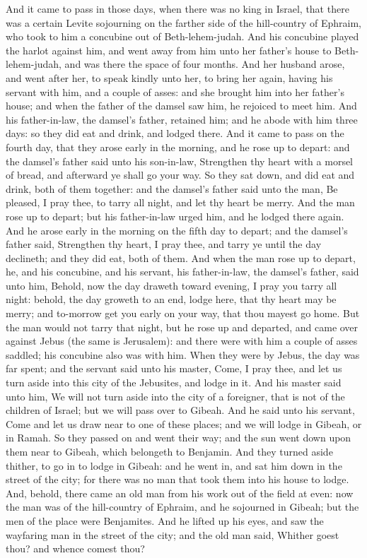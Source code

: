 And it came to pass in those days, when there was no king in Israel, that there was a certain Levite sojourning on the farther side of the hill-country of Ephraim, who took to him a concubine out of Beth-lehem-judah. And his concubine played the harlot against him, and went away from him unto her father’s house to Beth-lehem-judah, and was there the space of four months. And her husband arose, and went after her, to speak kindly unto her, to bring her again, having his servant with him, and a couple of asses: and she brought him into her father’s house; and when the father of the damsel saw him, he rejoiced to meet him. And his father-in-law, the damsel’s father, retained him; and he abode with him three days: so they did eat and drink, and lodged there. And it came to pass on the fourth day, that they arose early in the morning, and he rose up to depart: and the damsel’s father said unto his son-in-law, Strengthen thy heart with a morsel of bread, and afterward ye shall go your way. So they sat down, and did eat and drink, both of them together: and the damsel’s father said unto the man, Be pleased, I pray thee, to tarry all night, and let thy heart be merry. And the man rose up to depart; but his father-in-law urged him, and he lodged there again. And he arose early in the morning on the fifth day to depart; and the damsel’s father said, Strengthen thy heart, I pray thee, and tarry ye until the day declineth; and they did eat, both of them. And when the man rose up to depart, he, and his concubine, and his servant, his father-in-law, the damsel’s father, said unto him, Behold, now the day draweth toward evening, I pray you tarry all night: behold, the day groweth to an end, lodge here, that thy heart may be merry; and to-morrow get you early on your way, that thou mayest go home.  But the man would not tarry that night, but he rose up and departed, and came over against Jebus (the same is Jerusalem): and there were with him a couple of asses saddled; his concubine also was with him. When they were by Jebus, the day was far spent; and the servant said unto his master, Come, I pray thee, and let us turn aside into this city of the Jebusites, and lodge in it. And his master said unto him, We will not turn aside into the city of a foreigner, that is not of the children of Israel; but we will pass over to Gibeah. And he said unto his servant, Come and let us draw near to one of these places; and we will lodge in Gibeah, or in Ramah. So they passed on and went their way; and the sun went down upon them near to Gibeah, which belongeth to Benjamin. And they turned aside thither, to go in to lodge in Gibeah: and he went in, and sat him down in the street of the city; for there was no man that took them into his house to lodge.  And, behold, there came an old man from his work out of the field at even: now the man was of the hill-country of Ephraim, and he sojourned in Gibeah; but the men of the place were Benjamites. And he lifted up his eyes, and saw the wayfaring man in the street of the city; and the old man said, Whither goest thou? and whence comest thou? 
